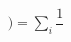 \documentclass[preview]{standalone}
\begin{document}
\begin{align*}
) = \sum_i\dfrac{1}{}
\end{align*}
\end{document}

